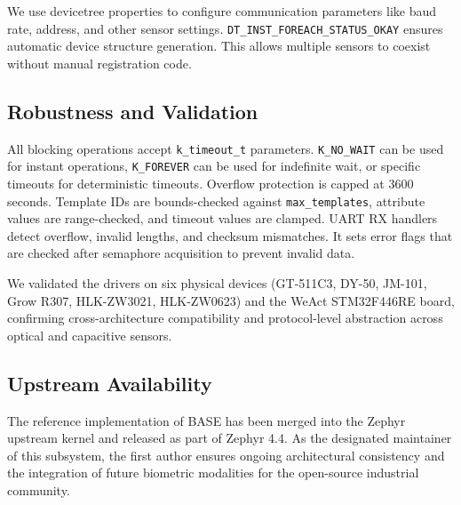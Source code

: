 We use devicetree properties to configure communication parameters like baud rate, address, and other sensor settings. \texttt{DT\_INST\_FOREACH\_STATUS\_OKAY} ensures automatic device structure generation. This allows multiple sensors to coexist without manual registration code.

\subsection{Robustness and Validation}
All blocking operations accept \texttt{k\_timeout\_t} parameters. \texttt{K\_NO\_WAIT} can be used for instant operations, \texttt{K\_FOREVER} can be used for indefinite wait, or specific timeouts for deterministic timeouts. Overflow protection is capped at 3600 seconds. Template IDs are bounds-checked against \texttt{max\_templates}, attribute values are range-checked, and timeout values are clamped. UART RX handlers detect overflow, invalid lengths, and checksum mismatches. It sets error flags that are checked after semaphore acquisition to prevent invalid data.

We validated the drivers on six physical devices (GT-511C3, DY-50, JM-101, Grow R307, HLK-ZW3021, HLK-ZW0623) and the WeAct STM32F446RE board, confirming cross-architecture compatibility and protocol-level abstraction across optical and capacitive sensors.

\subsection{Upstream Availability}
\label{sec:availability}
The reference implementation of BASE has been merged\cite{zephyr_pr} into the Zephyr upstream kernel and released as part of Zephyr 4.4\cite{zephyr_44_notes}. As the designated maintainer of this subsystem, the first author ensures ongoing architectural consistency and the integration of future biometric modalities for the open-source industrial community.